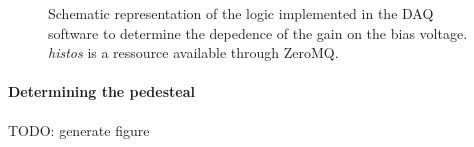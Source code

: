 \begin{figure}
  \caption{%
    Schematic representation of the logic implemented in the DAQ software to determine the depedence of the gain on the bias voltage.
    \emph{histos} is a ressource available through ZeroMQ.
  }
  \label{fig:adquisitor_logic}
\end{figure}

\paragraph{Determining the pedesteal}
TODO: generate figure


